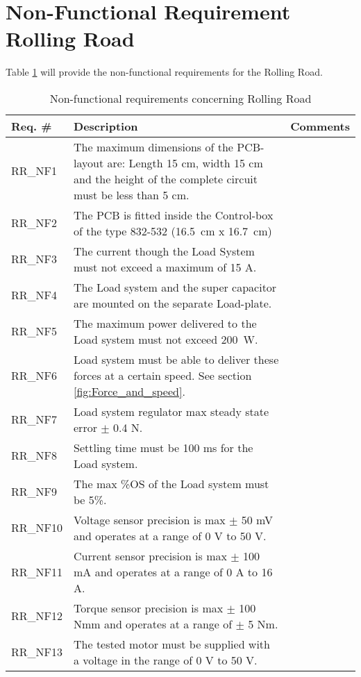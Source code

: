 \section{Non-Functional Requirement Rolling Road}
Table \ref{NFREQ_RR} will provide the non-functional requirements for the Rolling Road.

\begin{table}[h!]
	\label{NFREQ_RR}
	\centering
	\begin{tabular}{|p{2 cm}|p{10 cm}|p{2 cm}|}
		\hline
		\textbf{Req. \#} & \textbf{Description} & \textbf{Comments} \\\hline
		RR\_NF1
		& The maximum dimensions of the PCB-layout are: Length 15 cm, width 15 cm and the height of the complete circuit must be less than 5 cm. 
		&  \\ \hline
		RR\_NF2
		& The PCB is fitted inside the Control-box of the type 832-532 (\SI{16.5}{\centi \meter} x \SI{16.7}{\centi \meter})
		& \\ \hline
		RR\_NF3
		& The current though the Load System must not exceed a maximum of 15 A.
		& \\ \hline
		RR\_NF4
		& The Load system and the super capacitor are mounted on the separate Load-plate.
		& \\ \hline
		RR\_NF5
		& The maximum power delivered to the Load system must not exceed \SI{200}{\watt}.
		& \\ \hline
		RR\_NF6 
		& Load system must be able to deliver these forces at a certain speed. See section \vref{fig:Force_and_speed}.
		& \\ \hline
		RR\_NF7
		& Load system regulator max steady state error $\pm$ 0.4 N. 
		& \\ \hline
		RR\_NF8
		& Settling time must be 100 ms for the Load system. 
		&  \\ \hline
		RR\_NF9
		&  The max \%OS of the Load system must be 5\%. 
		&  \\ \hline
		RR\_NF10
		& Voltage sensor precision is max $\pm$ 50 mV and operates at a range of 0 V to 50 V. 
		&  \\ \hline
		RR\_NF11
		& Current sensor precision is max $\pm$ 100 mA and operates at a range of 0 A to 16 A. 
		&  \\ \hline
		RR\_NF12
		& Torque sensor precision is max $\pm$ 100 Nmm and operates at a range of $\pm$ 5 Nm. 
		&  \\ \hline
		RR\_NF13
		& The tested motor must be supplied with a voltage in the range of 0 V to 50 V. 
		&  \\ \hline
	\end{tabular}
	\caption{Non-functional requirements concerning Rolling Road}
\end{table}

